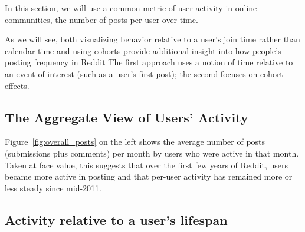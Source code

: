 In this section, we will use a common metric of user activity in online communities, the number of posts per user over time. 

As we will see, both visualizing behavior relative to a user's join time rather than calendar time and using cohorts provide additional insight into how people's posting frequency in Reddit 
The first approach uses a notion of time relative to an event of interest (such as a user's first post); the second focuses on cohort effects.

\subsection{The Aggregate View of Users' Activity}

Figure~\ref{fig:overall_posts} on the left shows the average number of posts (submissions plus comments) per month by users who were active in that month.  Taken at face value, this suggests that over the first few years of Reddit, users became more active in posting and that per-user activity has remained more or less steady since mid-2011.

\subsection{Activity relative to a user's lifespan}



